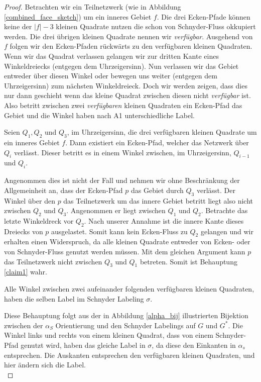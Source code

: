 \begin{proof}
Betrachten wir ein Teilnetzwerk (wie in Abbildung \ref{combined_face_sketch}) um ein inneres Gebiet $f$. Die drei Ecken-Pfade können keine der $|f|-3$ kleinen Quadrate nutzen die schon von Schnyder-Fluss okkupiert werden. Die drei übrigen kleinen Quadrate nennen wir \textit{verfügbar}. Ausgehend von $f$ folgen wir den Ecken-Pfaden rückwärts zu den verfügbaren kleinen Quadraten. Wenn wir das Quadrat verlassen gelangen wir zur dritten Kante eines Winkeldreiecks (entgegen dem Uhrzeigersinn). Nun verlassen wir das Gebiet entweder über diesen Winkel oder bewegen uns weiter (entgegen dem Uhrzeigersinn) zum nächsten Winkeldreieck. Doch wir werden zeigen, dass dies nur dann geschieht wenn das kleine Quadrat zwischen diesen nicht \textit{verfügbar} ist. Also betritt zwischen zwei \textit{verfügbaren} kleinen Quadraten ein Ecken-Pfad das Gebiet und die Winkel haben nach A1 unterschiedliche Label.

\begin{claim}\label{claim1}
Seien $Q_1,Q_2$ und $Q_3$, im Uhrzeigersinn, die drei verfügbaren kleinen Quadrate um ein inneres Gebiet $f$. Dann existiert ein Ecken-Pfad, welcher das Netzwerk über $Q_i$ verlässt. Dieser betritt es in einem Winkel zwischen, im Uhrzeigersinn, $Q_{i-1}$ und $Q_i$.
\end{claim}

Angenommen dies ist nicht der Fall und nehmen wir ohne Beschränkung der Allgemeinheit an, dass der Ecken-Pfad $p$ das Gebiet durch $Q_3$ verlässt. Der Winkel über den $p$ das Teilnetzwerk um das innere Gebiet betritt liegt also nicht zwischen $Q_2$ und $Q_3$. Angenommen er liegt zwischen $Q_1$ und $Q_2$. Betrachte das letzte Winkeldreck vor $Q_2$. Nach unserer Annahme ist die innere Kante dieses Dreiecks von $p$ ausgelastet. Somit kann kein Ecken-Fluss zu $Q_2$ gelangen und wir erhalten einen Widerspruch, da alle kleinen Quadrate entweder von Ecken- oder von Schnyder-Fluss genutzt werden müssen. Mit dem gleichen Argument kann $p$ das Teilnetzwerk nicht zwischen $Q_3$ und $Q_1$ betreten. Somit ist Behauptung \ref{claim1} wahr.

\begin{claim}
Alle Winkel zwischen zwei aufeinander folgenden verfügbaren kleinen Quadraten, haben die selben Label im Schnyder Labeling $\sigma$.
\end{claim}
Diese Behauptung folgt aus der in Abbildung \ref{alpha_bij} illustrierten Bijektion zwischen der $\alpha_S$ Orientierung und den Schnyder Labelings auf $G$ und $G^*$. Die Winkel links und rechts von einem kleinen Quadrat, dass von einem Schnyder-Pfad genutzt wird, haben das gleiche Label in $\sigma$, da diese den Einkanten in $\alpha_s$ entsprechen. Die Auskanten entsprechen den verfügbaren kleinen Quadraten, und hier ändern sich die Label.\\


\end{proof}
